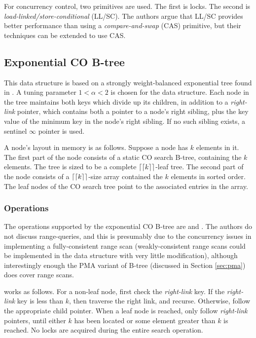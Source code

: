 \documentclass{style}
\begin{document}
For concurrency control, two primitives are used. The first is
locks. The second is \textit{load-linked/store-conditional} (LL/SC).
The authors argue that LL/SC provides better performance than 
using a \textit{compare-and-swap} (CAS) primitive, but their 
techniques can be extended to use CAS.

\subsection{Exponential CO B-tree}
This data structure is based on a strongly weight-balanced 
exponential tree found in \cite{Bender2002}. A tuning parameter
$1 < \alpha < 2$ is chosen for the data structure. Each node
in the tree maintains both keys which divide up its children,
in addition to a \textit{right-link} pointer, which contains
both a pointer to a node's right sibling, plus the key
value of the minimum key in the node's right sibling. If no such
sibling exists, a sentinel $\infty$ pointer is used.

A node's layout in memory is as follows. Suppose a node has $k$
elements in it. The first part of the node consists of a static
CO search B-tree, containing the $k$ elements. The tree is sized
to be a complete $\lceil\lceil k \rceil\rceil$-leaf tree. The second
part of the node consists of a $\lceil\lceil k \rceil\rceil$-size array
contained the $k$ elements in sorted order. The leaf nodes of the
CO search tree point to the associated entries in the array.

\subsubsection{Operations}
The operations supported by the exponential CO B-tree are \Search{}
and \Insert{}. The authors do not discuss range-queries, and this
is presumably due to the concurrency issues in implementing a fully-consistent
range scan (weakly-consistent range scans could be implemented in the data
structure with very little modification), although interestingly enough
the PMA variant of B-tree (discussed in Section \ref{sec:pma}) does
cover range scans. 

\Search{} works as follows. For a non-leaf node, first check the
\textit{right-link} key. If the \textit{right-link} key is less than
$k$, then traverse the right link, and recurse. Otherwise, follow
the appropriate child pointer. When a leaf node is reached, only
follow \textit{right-link} pointers, until either $k$ has been located
or some element greater than $k$ is reached. No locks are acquired
during the entire search operation.
\end{document}
